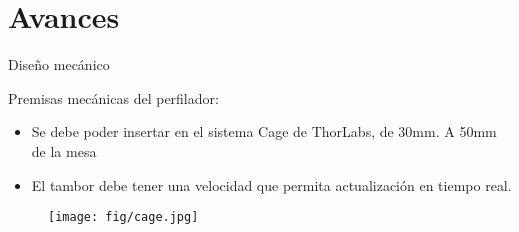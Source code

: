 \section{Avances}

\begin{frame}{Diseño mecánico}

Premisas mecánicas del perfilador:

\begin{minipage}[t]{0.5\textwidth}
\begin{itemize}
\item Se debe poder insertar en el sistema Cage de ThorLabs, de 30mm. A 50mm de la mesa
\item El tambor debe tener una velocidad que permita actualización en tiempo real.
\end{itemize}
\end{minipage}
%
\begin{minipage}[t]{0.45\textwidth}
\begin{figure}[H]
\centering
\texttt{[image: fig/cage.jpg]}
\label{fig:cage}
\end{figure}
\end{minipage}


\end{frame}


